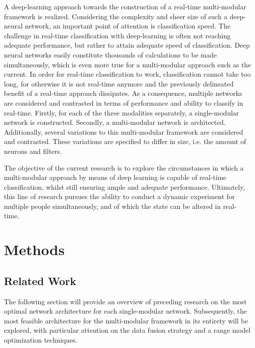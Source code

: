 \documentclass[12pt]{article}
\begin{document}
A deep-learning approach towards the construction of a real-time multi-modular framework is realized. Considering the complexity and sheer size of such a deep-neural network, an important point of attention is classification speed. The challenge in real-time classification with deep-learning is often not reaching adequate performance, but rather to attain adequate speed of classification. Deep neural networks easily constitute thousands of calculations to be made simultaneously, which is even more true for a multi-modular approach such as the current. In order for real-time classification to work, classification cannot take too long, for otherwise it is not real-time anymore and the previously delineated benefit of a real-time approach dissipates. As a consequence, multiple networks are considered and contrasted in terms of performance and ability to classify in real-time. Firstly, for each of the three modalities separately, a single-modular network is constructed. Secondly, a multi-modular network is architected. Additionally, several variations to this multi-modular framework are considered and contrasted. These variations are specified to differ in size, i.e. the amount of neurons and filters. 

The objective of the current research is to explore the circumstances in which a multi-modular approach by means of deep learning is capable of real-time classification, whilst still ensuring ample and adequate performance. Ultimately, this line of research pursues the ability to conduct a dynamic experiment for multiple people simultaneously, and of which the state can be altered in real-time. 

\section{Methods}

\subsection{Related Work} 
The following section will provide an overview of preceding research on the most optimal network architecture for each single-modular network. Subsequently, the most feasible architecture for the multi-modular framework in its entirety will be explored, with particular attention on the data fusion strategy and a range model optimization techniques.
\end{document}
